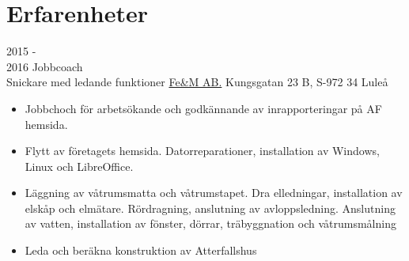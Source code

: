 \documentclass[a4paper]{twentysecondcv} %
\begin{document}



\section{Erfarenheter}

\begin{twenty} %
	\twentyitem
    	{2015 - \\ 2016}
        {Jobbcoach \\ Snickare med ledande funktioner}
        {\href{http://femkonsult.se/}{Fe\&M AB.}}
        {Kungsgatan 23 B, S-972 34 Luleå}
        {
        {\begin{itemize}
        \item Jobbchoch för arbetsökande och godkännande av inrapporteringar på AF hemsida.
        \item Flytt av företagets hemsida. Datorreparationer, installation av Windows, Linux 
        och LibreOffice.
        \item Läggning av våtrumsmatta och våtrumstapet. Dra elledningar, installation av 
        elskåp och elmätare. Rördragning, anslutning av avloppsledning. Anslutning av vatten,
        installation av fönster, dörrar, träbyggnation och våtrumsmålning
        \item Leda och beräkna konstruktion av Atterfallshus
    \end{itemize}}
        }
\end{twenty}
\end{document}
